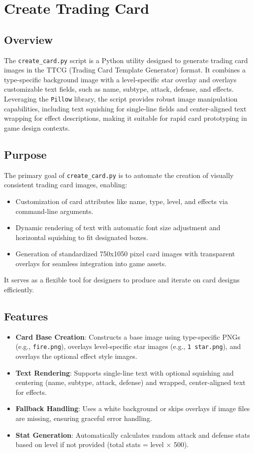 \section{Create Trading Card}
\subsection{Overview}
The \texttt{create\_card.py} script is a Python utility designed to generate trading card images in the TTCG (Trading Card Template Generator) format. It combines a type-specific background image with a level-specific star overlay and overlays customizable text fields, such as name, subtype, attack, defense, and effects. Leveraging the \texttt{Pillow} library, the script provides robust image manipulation capabilities, including text squishing for single-line fields and center-aligned text wrapping for effect descriptions, making it suitable for rapid card prototyping in game design contexts.

\subsection{Purpose}
The primary goal of \texttt{create\_card.py} is to automate the creation of visually consistent trading card images, enabling:
\begin{itemize}
	\item Customization of card attributes like name, type, level, and effects via command-line arguments.
	\item Dynamic rendering of text with automatic font size adjustment and horizontal squishing to fit designated boxes.
	\item Generation of standardized 750x1050 pixel card images with transparent overlays for seamless integration into game assets.
\end{itemize}
It serves as a flexible tool for designers to produce and iterate on card designs efficiently.

\subsection{Features}
\begin{itemize}
	\item \textbf{Card Base Creation}: Constructs a base image using type-specific PNGs (e.g., \texttt{fire.png}), overlays level-specific star images (e.g., \texttt{1 star.png}), and overlays the optional effect style images.
	\item \textbf{Text Rendering}: Supports single-line text with optional squishing and centering (name, subtype, attack, defense) and wrapped, center-aligned text for effects.
	\item \textbf{Fallback Handling}: Uses a white background or skips overlays if image files are missing, ensuring graceful error handling.
	\item \textbf{Stat Generation}: Automatically calculates random attack and defense stats based on level if not provided (total stats = level $\times$ 500).
\end{itemize}

